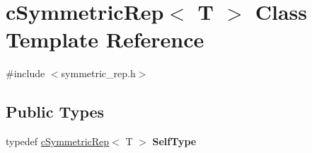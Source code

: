 \hypertarget{classcSymmetricRep}{
\section{c\-Symmetric\-Rep$<$ \-T $>$ \-Class \-Template \-Reference}
\label{classcSymmetricRep}
}


{\ttfamily \#include $<$symmetric\-\_\-rep.\-h$>$}

\subsection*{\-Public \-Types}
\begin{DoxyCompactItemize}
\item 
\hypertarget{classcSymmetricRep_abb21d3323b4e2133ec7bbc4f2d45d968}{
typedef \hyperlink{classcSymmetricRep}{c\-Symmetric\-Rep}$<$ \-T $>$ {\bfseries \-Self\-Type}}
\label{classcSymmetricRep_abb21d3323b4e2133ec7bbc4f2d45d968}

\end{DoxyCompactItemize}
